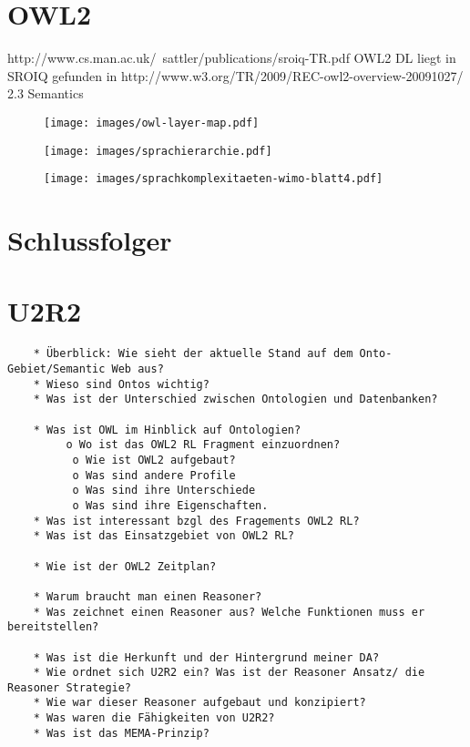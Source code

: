 \section{OWL2}
 http://www.cs.man.ac.uk/~sattler/publications/sroiq-TR.pdf
OWL2 DL liegt in SROIQ
gefunden in  http://www.w3.org/TR/2009/REC-owl2-overview-20091027/
2.3 Semantics
\begin{figure}
\texttt{[image: images/owl-layer-map.pdf]}
\end{figure}

\begin{figure}
\texttt{[image: images/sprachierarchie.pdf]}
\end{figure}

\begin{figure}
\texttt{[image: images/sprachkomplexitaeten-wimo-blatt4.pdf]}
\end{figure}

\section{Schlussfolger}

\section{U2R2}

\begin{verbatim}
    * Überblick: Wie sieht der aktuelle Stand auf dem Onto-Gebiet/Semantic Web aus?
    * Wieso sind Ontos wichtig?
    * Was ist der Unterschied zwischen Ontologien und Datenbanken? 
    
    * Was ist OWL im Hinblick auf Ontologien?
         o Wo ist das OWL2 RL Fragment einzuordnen?
          o Wie ist OWL2 aufgebaut?
          o Was sind andere Profile
          o Was sind ihre Unterschiede
          o Was sind ihre Eigenschaften.
    * Was ist interessant bzgl des Fragements OWL2 RL?
    * Was ist das Einsatzgebiet von OWL2 RL?
    
    * Wie ist der OWL2 Zeitplan?
    
    * Warum braucht man einen Reasoner?
    * Was zeichnet einen Reasoner aus? Welche Funktionen muss er bereitstellen?
    
    * Was ist die Herkunft und der Hintergrund meiner DA?
    * Wie ordnet sich U2R2 ein? Was ist der Reasoner Ansatz/ die Reasoner Strategie?
    * Wie war dieser Reasoner aufgebaut und konzipiert?
    * Was waren die Fähigkeiten von U2R2?
    * Was ist das MEMA-Prinzip?
    
    
\end{verbatim}
